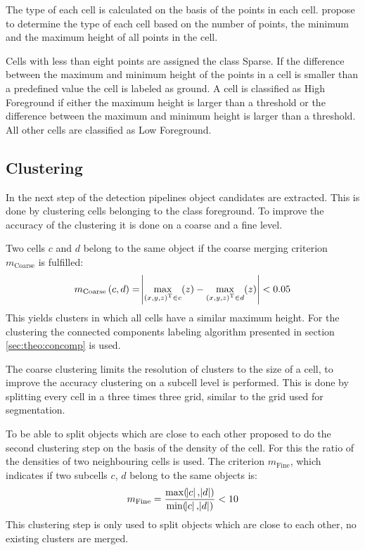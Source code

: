 The type of each cell is calculated on the basis of the points in each cell. 
\cite{AttBen17} propose to determine the type of each cell based on the number of points, the minimum and the maximum height of all points in the cell. 

Cells with less than eight points are assigned the class Sparse. 
If the difference between the maximum and minimum height of the points in a cell is smaller than a predefined value the cell is labeled as ground.
A cell is classified as High Foreground if either the maximum height is larger than a threshold or the difference between the maximum and minimum height is larger than a threshold. 
All other cells are classified as Low Foreground.

\subsection{Clustering}
In the next step of the detection pipelines object candidates are extracted. This is done by clustering cells belonging to the class foreground. To improve the accuracy of the clustering it is done on a coarse and a fine level.

Two cells $c$ and $d$ belong to the same object if the coarse merging criterion $m_\text{Coarse}$ is fulfilled:
\begin{equation}
    m_\text{Coarse}\,  (c,d) = \abs{ \max_{{(x,y,z)}^\text{T} \in c}(z) - \max_{{(x,y,z)}^\text{T} \in d}(z) } < 0.05
\end{equation}
This yields clusters in which all cells have a similar maximum height. For the clustering the connected components labeling algorithm presented in section \ref{sec:theo:concomp} is used.

The coarse clustering limits the resolution of clusters to the size of a cell, to improve the accuracy clustering on a subcell level is performed. This is done by splitting every cell in a three times three grid, similar to the grid used for segmentation.

To be able to split objects which are close to each other \cite{AttBen14} proposed to do the second clustering step on the basis of the density of the cell. 
For this the ratio of the densities of two neighbouring cells is used. 
The criterion $m_\text{Fine}$, which indicates if two subcells $c$, $d$ belong to the same objects is:
\begin{equation}
    m_\text{Fine} = \frac{\max(\abs{c}, \abs{d})}{\min(\abs{c}, \abs{d})} < 10 
\end{equation}
This clustering step is only used to split objects which are close to each other, no existing clusters are merged.

